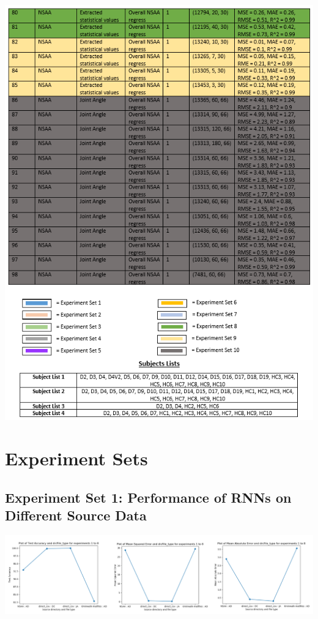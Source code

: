 \documentclass[12pt,twoside]{report}
\begin{document}
\begin{center}
\includegraphics[scale=1]{project_figures/fig10_6}
\end{center}






\chapter{Experiment Sets\\}


\section{Experiment Set 1: Performance of RNNs on Different Source Data}

\begin{center}
\includegraphics[scale=0.4]{project_figures/fig10_7}
\end{center}
\end{document}
